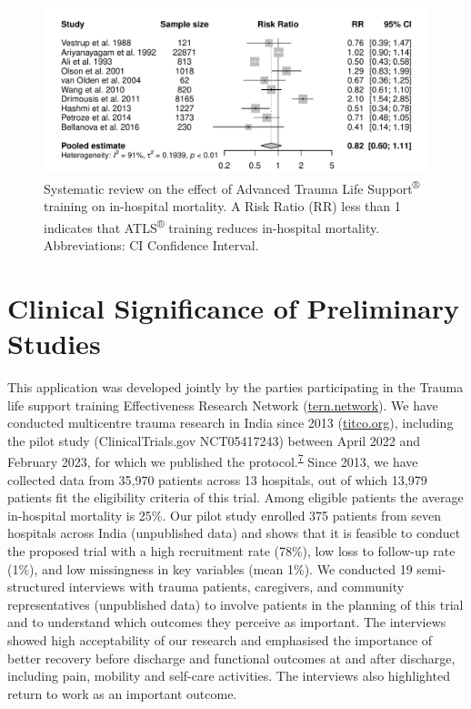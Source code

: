 \documentclass[
  11pt,
]{article}
\begin{document}
\begin{figure}
\centering
\includegraphics{forest-plot.pdf}
\caption{\label{fig:forest-plot}Systematic review on the effect of Advanced Trauma Life Support\textsuperscript{®} training on in-hospital mortality. A Risk Ratio (RR) less than 1 indicates that ATLS\textsuperscript{®} training reduces in-hospital mortality. Abbreviations: CI Confidence Interval.}
\end{figure}

\hypertarget{clinical-significance-of-preliminary-studies}{%
\section{Clinical Significance of Preliminary Studies}\label{clinical-significance-of-preliminary-studies}}

This application was developed jointly by the parties participating in the Trauma life support training Effectiveness Research Network (\href{https://www.tern.network}{tern.network}). We have conducted multicentre trauma research in India since 2013 (\href{https://www.titco.org}{titco.org}), including the pilot study (ClinicalTrials.gov NCT05417243) between April 2022 and February 2023, for which we published the protocol.\textsuperscript{\protect\hyperlink{ref-GerdinWuxe4rnberg2022}{7}} Since 2013, we have collected data from 35,970 patients across 13 hospitals, out of which 13,979 patients fit the eligibility criteria of this trial. Among eligible patients the average in-hospital mortality is 25\%. Our pilot study enrolled 375 patients from seven hospitals across India (unpublished data) and shows that it is feasible to conduct the proposed trial with a high recruitment rate (78\%), low loss to follow-up rate (1\%), and low missingness in key variables (mean 1\%). We conducted 19 semi-structured interviews with trauma patients, caregivers, and community representatives (unpublished data) to involve patients in the planning of this trial and to understand which outcomes they perceive as important. The interviews showed high acceptability of our research and emphasised the importance of better recovery before discharge and functional outcomes at and after discharge, including pain, mobility and self-care activities. The interviews also highlighted return to work as an important outcome.
\end{document}
